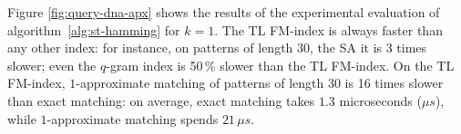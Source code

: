 
%

Figure \ref{fig:query-dna-apx} shows the results of the experimental evaluation of algorithm~\ref{alg:st-hamming} for $k=1$.
The TL FM-index is always faster than any other index: for instance, on patterns of length 30, the SA it is 3 times slower; even the $q$-gram index is 50\,\% slower than the TL FM-index.
On the TL FM-index, $1$-approximate matching of patterns of length 30 is 16 times slower than exact matching: on average, exact matching takes $1.3$ microseconds ($\mu s$), while $1$-approximate matching spends $21 \, \mu s$.

